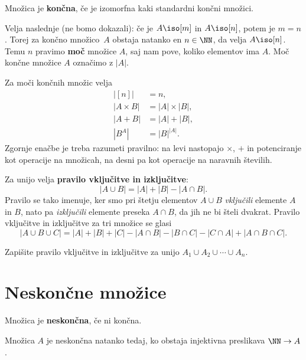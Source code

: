 \begin{definicija}
  Množica je \textbf{končna}, če je izomorfna kaki standardni končni množici.
\end{definicija}


Velja naslednje (ne bomo dokazali): če je $A \iso [m]$ in $A \iso [n]$, potem je $m = n$. Torej za končno
množico~$A$ obstaja natanko en $n \in \NN$, da velja $A \iso [n]$. Temu $n$ pravimo \textbf{moč} množice $A$,
saj nam pove, koliko elementov ima $A$. Moč končne množice $A$ označimo z $|A|$.

Za moči končnih množic velja
%
\begin{align*}
  |[n]| &= n, \\
  |A \times B| &= |A| \times |B|, \\
  |A + B| &= |A| + |B|, \\
  |B^A| &= |B|^{|A|}.
\end{align*}
%
Zgornje enačbe je treba razumeti pravilno: na levi nastopajo $\times$, $+$ in potenciranje kot operacije na množicah, na desni pa kot operacije na naravnih številih.

Za unijo velja \textbf{pravilo vključitve in izključitve}:
%
\begin{equation*}
 |A \cup B| = |A| + |B| - |A \cap B|.
\end{equation*}
%
Pravilo se tako imenuje, ker smo pri štetju elementov $A \cup B$ \emph{vključili} elemente $A$ in $B$, nato pa \emph{izključili} elemente preseka $A \cap B$, da jih ne bi šteli dvakrat.
%
Pravilo vključitve in izključitve za tri množice se glasi
%
\begin{equation*}
  |A \cup B \cup C| = |A| + |B| + |C| - |A \cap B| - |B \cap C| - |C \cap A| + |A \cap B \cap C|.
\end{equation*}

\begin{vaja}
  Zapišite pravilo vključitve in izključitve za unijo $A_1 \cup A_2 \cup \cdots \cup A_n$.
\end{vaja}


\section{Neskončne množice}

\begin{definicija}
  Množica je \textbf{neskončna}, če ni končna.
\end{definicija}

\begin{izrek}
  Množica $A$ je neskončna natanko tedaj, ko obstaja injektivna preslikava $\NN \to A$.
\end{izrek}

